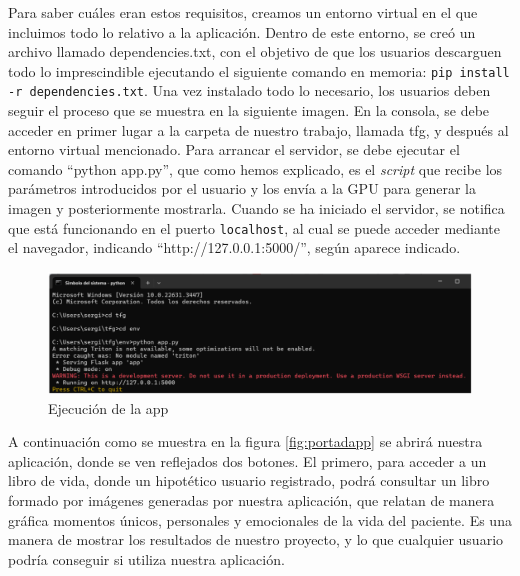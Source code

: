 Para saber cuáles eran estos requisitos, creamos un entorno virtual en el que incluimos todo lo relativo a la aplicación. Dentro de este entorno, se creó un archivo llamado dependencies.txt, con el objetivo de que los usuarios descarguen todo lo imprescindible ejecutando el siguiente comando en memoria: \texttt{pip install -r dependencies.txt}. Una vez instalado todo lo necesario, los usuarios deben seguir el proceso que se muestra en la siguiente imagen. En la consola, se debe acceder en primer lugar a la carpeta de nuestro trabajo, llamada tfg, y después al entorno virtual mencionado. Para arrancar el servidor, se debe ejecutar el comando ``python app.py'', que como hemos explicado, es el \textit{script} que recibe los parámetros introducidos por el usuario y los envía a la GPU para generar la imagen y posteriormente mostrarla. Cuando se ha iniciado el servidor, se notifica que está funcionando en el puerto \texttt{localhost}, al cual se puede acceder mediante el navegador, indicando “http://127.0.0.1:5000/”, según aparece indicado. \\
\begin{figure}[!htb]
	\centering
	\includegraphics[width = 1
	\textwidth]{Imagenes/Vectorial/exeapp.png}
	\caption{Ejecución de la app}
	\label{fig:appexe}
\end{figure}

A continuación como se muestra en la figura \ref{fig:portadapp} se abrirá nuestra aplicación, donde se ven reflejados dos botones. El primero, para acceder a un libro de vida, donde un hipotético usuario registrado, podrá consultar un libro formado por imágenes generadas por nuestra aplicación, que relatan de manera gráfica momentos únicos, personales y emocionales de la vida del paciente. Es una manera de mostrar los resultados de nuestro proyecto, y lo que cualquier usuario podría conseguir si utiliza nuestra aplicación. \\

